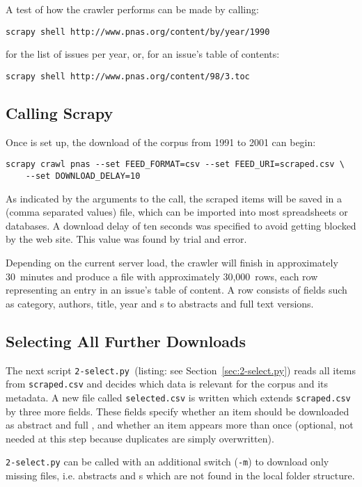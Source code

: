 A test of how the crawler performs can be made by calling:
\begin{verbatim}
scrapy shell http://www.pnas.org/content/by/year/1990
\end{verbatim}
for the list of issues per year, or, for an issue's table of contents:
\begin{verbatim}
scrapy shell http://www.pnas.org/content/98/3.toc
\end{verbatim}

\subsection{Calling Scrapy}
Once  is set up, the download of the corpus from 1991 to 2001 can begin:
\begin{verbatim}
scrapy crawl pnas --set FEED_FORMAT=csv --set FEED_URI=scraped.csv \
    --set DOWNLOAD_DELAY=10
\end{verbatim}
As indicated by the arguments to the call, the scraped items will be saved in a  (comma separated values) file, which can be imported into most spreadsheets or databases. A download delay of ten seconds was specified to avoid getting blocked by the  web site. This value was found by trial and error.

Depending on the current server load, the crawler will finish in approximately 30~minutes and produce a  file with approximately 30,000~rows, each row representing an entry in an issue's table of content. A row consists of fields such as category, authors, title, year and s to abstracts and full text versions.

\subsection{Selecting All Further Downloads}
\label{sec:selecting}
The next  script \texttt{2-select.py }(listing: see Section~\ref{sec:2-select.py}) reads all items from \texttt{scraped.csv} and decides which data is relevant for the corpus and its metadata.
A new file called \texttt{selected.csv} is written which extends \texttt{scraped.csv} by three more fields. These fields specify whether an item should be downloaded as abstract and full \acronym{Pdf}, and whether an item appears more than once (optional, not needed at this step because duplicates are simply overwritten).

\texttt{2-select.py} can be called with an additional switch (\texttt{-m}) to download only missing files, i.e. abstracts and s which are not found in the local folder structure.


